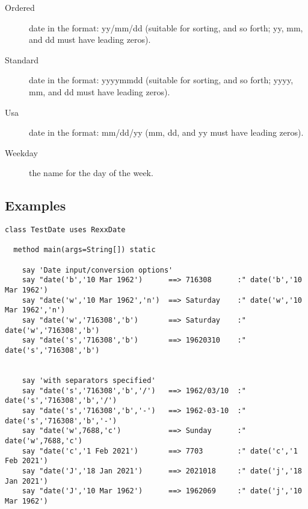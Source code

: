 \begin{description}
\item[Ordered]
date in the format: yy/mm/dd (suitable for sorting, and so forth; yy, mm, and dd must have leading zeros).
\item[Standard]
date in the format: yyyymmdd (suitable for sorting, and so forth; yyyy, mm, and dd must have leading zeros).
\item[Usa]
date in the format: mm/dd/yy (mm, dd, and yy must have leading zeros).
\item[Weekday]
the name for the day of the week.
\end{description}
\subsection{Examples}

\begin{lstlisting}[label=datessexample,caption=Example of using Date()]
  class TestDate uses RexxDate

  method main(args=String[]) static

    say 'Date input/conversion options'
    say "date('b','10 Mar 1962')      ==> 716308      :" date('b','10 Mar 1962')
    say "date('w','10 Mar 1962','n')  ==> Saturday    :" date('w','10 Mar 1962','n')
    say "date('w','716308','b')       ==> Saturday    :" date('w','716308','b')
    say "date('s','716308','b')       ==> 19620310    :" date('s','716308','b')


    say 'with separators specified'
    say "date('s','716308','b','/')   ==> 1962/03/10  :" date('s','716308','b','/')
    say "date('s','716308','b','-')   ==> 1962-03-10  :" date('s','716308','b','-')
    say "date('w',7688,'c')           ==> Sunday      :" date('w',7688,'c')
    say "date('c','1 Feb 2021')       ==> 7703        :" date('c','1 Feb 2021')
    say "date('J','18 Jan 2021')      ==> 2021018     :" date('j','18 Jan 2021')
    say "date('J','10 Mar 1962')      ==> 1962069     :" date('j','10 Mar 1962')
  \end{lstlisting}

